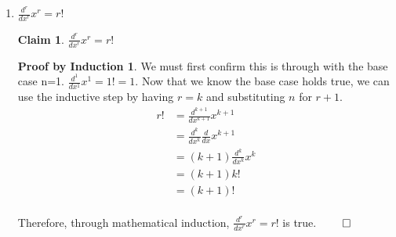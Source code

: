 \documentclass[11pt]{letter}
\newtheorem{claim}{Claim}
\theoremstyle{definition}
\newtheorem{PBI}{Proof by Induction}
\begin{document}
\begin{description}
\begin{enumerate}
				You {\bfseries may not} use the previous result. You may use {\bfseries only} the following calculus facts: the linearity properties of the integral; $\int C dx=Cx+D$ for some constant $D$; $\frac{d}{dx} x=1$; integration by parts.
			\item $\frac{d^r}{dx^r}x^r=r!$
\begin{claim}
$\frac{d^r}{dx^r}x^r=r!$
\end{claim}
\begin{PBI}
We must first confirm this is through with the base case n=1. $\frac{d^1}{dx^1}x^1=1!=1$. Now that we know the base case holds true, we can use the inductive step by having $r=k$ and substituting $n$ for $r+1$.
\begin{align*}
r!&=\frac{d^{k+1}}{dx^{k+1}}x^{k+1} \\
&=\frac{d^k}{dx^k}\frac{d}{dx}x^{k+1} \\
&=(k+1)\frac{d^k}{dx^k}x^k \tag{Uses Claim 4 as well as the constant multiple rule of derivatives.} \\
&=(k+1)k! \tag{Substitutes equation given in the claim.} \\
&=(k+1)! \tag{Uses definition of factorial} \\
\end{align*}
\end{PBI}
Therefore, through mathematical induction, $\frac{d^r}{dx^r}x^r=r!$ is true. $\qed$


\end{enumerate}
\end{description}
\end{document}
